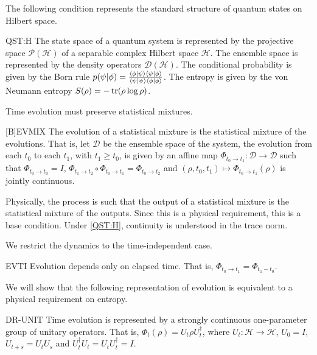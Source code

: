 \documentclass{techbrief}
\begin{document}
The following condition represents the standard structure of quantum states on Hilbert space.
\begin{condition}{QST:H}
	The state space of a quantum system is represented by the projective space $\mathcal{P}(\mathcal{H})$ of a separable complex Hilbert space $\mathcal{H}$. The ensemble space is represented by the density operators $\mathcal{D}(\mathcal{H})$. The conditional probability is given by the Born rule $p(\psi|\phi) = \frac{\langle \phi | \psi \rangle\langle \psi | \phi \rangle}{\langle \psi | \psi \rangle\langle \phi | \phi \rangle}$. The entropy is given by the von Neumann entropy $S(\rho) = -\operatorname{tr}(\rho \log \rho)$.
\end{condition}

Time evolution must preserve statistical mixtures.
\begin{condition}{[B]EVMIX}
	The evolution of a statistical mixture is the statistical mixture of the evolutions. That is, let $\mathcal{D}$ be the ensemble space of the system, the evolution from each $t_0$ to each $t_1$, with $t_1\geq t_0$, is given by an affine map $\Phi_{t_0 \to t_1}:\mathcal{D}\to \mathcal{D}$ such that $\Phi_{t_0 \to t_0}=I$, $\Phi_{t_1 \to t_2}\circ \Phi_{t_0 \to t_1}=\Phi_{t_0 \to t_2}$ and $(\rho,t_0,t_1)\mapsto \Phi_{t_0 \to t_1}(\rho)$ is jointly continuous.
\end{condition}
Physically, the process is such that the output of a statistical mixture is the statistical mixture of the outputs. Since this is a physical requirement, this is a base condition. Under \ref{QST:H}, continuity is understood in the trace norm.

We restrict the dynamics to the time-independent case.
\begin{condition}{EVTI}
	Evolution depends only on elapsed time. That is, $\Phi_{t_0 \to t_1}=\Phi_{t_1-t_0}$.
\end{condition}

We will show that the following representation of evolution is equivalent to a physical requirement on entropy.
\begin{condition}{DR-UNIT}
	Time evolution is represented by a strongly continuous one-parameter group of unitary operators. That is, $\Phi_t(\rho)=U_t\rho U_t^\dagger$, where $U_t:\mathcal{H}\to\mathcal{H}$, $U_0=I$, $U_{t+s}=U_tU_s$ and $U_t^\dagger U_t=U_tU_t^\dagger=I$.
\end{condition}
\end{document}
